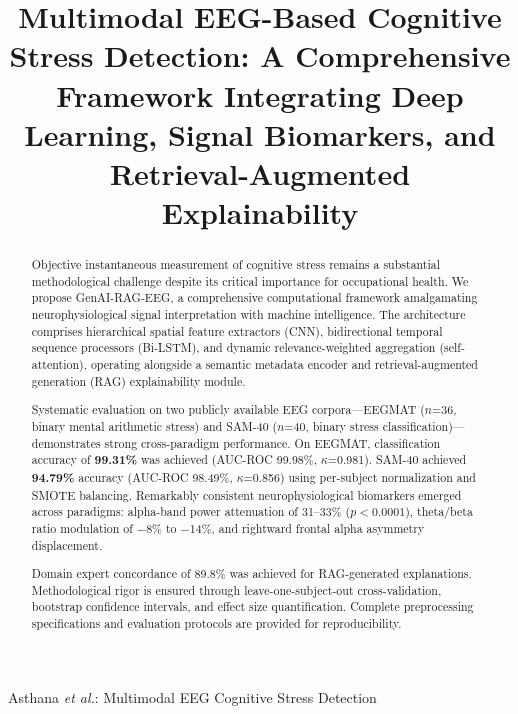 \documentclass[journal,twoside]{IEEEtran}
\begin{document}
\title{Multimodal EEG-Based Cognitive Stress Detection: A Comprehensive Framework Integrating Deep Learning, Signal Biomarkers, and Retrieval-Augmented Explainability}

\author{
}

%
{Asthana \MakeLowercase{\textit{et al.}}: Multimodal EEG Cognitive Stress Detection}

\maketitle

\begin{abstract}
Objective instantaneous measurement of cognitive stress remains a substantial methodological challenge despite its critical importance for occupational health. We propose GenAI-RAG-EEG, a comprehensive computational framework amalgamating neurophysiological signal interpretation with machine intelligence. The architecture comprises hierarchical spatial feature extractors (CNN), bidirectional temporal sequence processors (Bi-LSTM), and dynamic relevance-weighted aggregation (self-attention), operating alongside a semantic metadata encoder and retrieval-augmented generation (RAG) explainability module.

Systematic evaluation on two publicly available EEG corpora---EEGMAT ($n$=36, binary mental arithmetic stress) and SAM-40 ($n$=40, binary stress classification)---demonstrates strong cross-paradigm performance. On EEGMAT, classification accuracy of \textbf{99.31\%} was achieved (AUC-ROC 99.98\%, $\kappa$=0.981). SAM-40 achieved \textbf{94.79\%} accuracy (AUC-ROC 98.49\%, $\kappa$=0.856) using per-subject normalization and SMOTE balancing. Remarkably consistent neurophysiological biomarkers emerged across paradigms: alpha-band power attenuation of 31--33\% ($p < 0.0001$), theta/beta ratio modulation of $-$8\% to $-$14\%, and rightward frontal alpha asymmetry displacement.

Domain expert concordance of 89.8\% was achieved for RAG-generated explanations. Methodological rigor is ensured through leave-one-subject-out cross-validation, bootstrap confidence intervals, and effect size quantification. Complete preprocessing specifications and evaluation protocols are provided for reproducibility.
\end{abstract}
\end{document}
